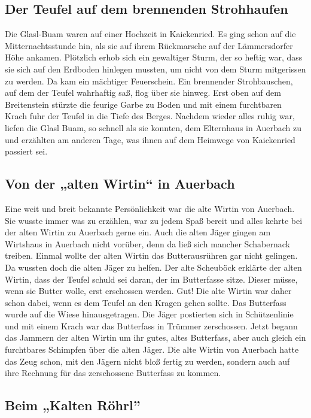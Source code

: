 \documentclass[12pt,a4pager]{book}
\begin{document}
\subsection{Der Teufel auf dem brennenden Strohhaufen}

Die Glasl-Buam waren auf einer Hochzeit in Kaickenried. Es ging schon auf die
Mitternachtsstunde hin, als sie auf ihrem Rückmarsche auf der Lämmersdorfer Höhe
ankamen. Plötzlich erhob sich ein gewaltiger Sturm, der so heftig war, dass sie
sich auf den Erdboden hinlegen mussten, um nicht von dem Sturm mitgerissen zu
werden. Da kam ein mächtiger Feuerschein. Ein brennender Strohbauschen, auf dem
der Teufel wahrhaftig saß, flog über sie hinweg. Erst oben auf dem Breitenstein
stürzte die feurige Garbe zu Boden und mit einem furchtbaren Krach fuhr der
Teufel in die Tiefe des Berges. Nachdem wieder alles ruhig war, liefen die Glasl
Buam, so schnell als sie konnten, dem Elternhaus in Auerbach zu und erzählten am
anderen Tage, was ihnen auf dem Heimwege von Kaickenried passiert sei.

\subsection{Von der „alten Wirtin“ in Auerbach}

Eine weit und breit bekannte Persönlichkeit war die alte Wirtin von Auerbach.
Sie wusste immer was zu erzählen, war zu jedem Spaß bereit und alles kehrte bei
der alten Wirtin zu Auerbach gerne ein. Auch die alten Jäger gingen am Wirtshaus
in Auerbach nicht vorüber, denn da ließ sich mancher Schabernack treiben. Einmal
wollte der alten Wirtin das Butterausrühren gar nicht gelingen. Da wussten doch
die alten Jäger zu helfen. Der alte Scheuböck erklärte der alten Wirtin, dass
der Teufel schuld sei daran, der im Butterfasse sitze. Dieser müsse, wenn sie
Butter wolle, erst erschossen werden. Gut! Die alte Wirtin war daher schon
dabei, wenn es dem Teufel an den Kragen gehen sollte. Das Butterfass wurde auf
die Wiese hinausgetragen. Die Jäger postierten sich in Schützenlinie und mit
einem Krach war das Butterfass in Trümmer zerschossen. Jetzt begann das Jammern
der alten Wirtin um ihr gutes, altes Butterfass, aber auch gleich ein
furchtbares Schimpfen über die alten Jäger. Die alte Wirtin von Auerbach hatte
das Zeug schon, mit den Jägern nicht bloß fertig zu werden, sondern auch auf
ihre Rechnung für das zerschossene Butterfass zu kommen.

\subsection{Beim „Kalten Röhrl”}
\end{document}
